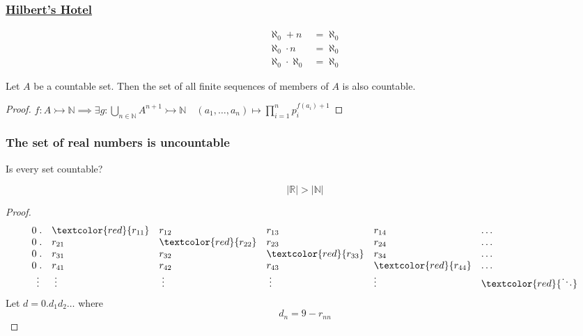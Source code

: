 \documentclass[UTF8,aspectratio=43,11pt,colorlinks,compress,openany]{beamer}%
\begin{document}
\begin{frame}\frametitle{\href{https://www.quora.com/What-if-I-requested-the-last-room-at-the-Hilberts-Hotel/answer/Alon-Amit?__snid3__=463182494&__nsrc__=2&__filter__=&from=timeline}{Hilbert's Hotel}}
	\begin{align*}
	\aleph_0+n&=\aleph_0\\
	\aleph_0\cdot n&=\aleph_0\\
	\aleph_0\cdot\aleph_0&=\aleph_0
	\end{align*}
	\begin{theorem}
		Let $A$ be a countable set. Then the set of all finite sequences of members of $A$ is also countable.
	\end{theorem}
	\begin{proof}
		$f: A\rightarrowtail\mathbb{N}\implies\exists g:\bigcup\limits_{n\in\mathbb{N}} A^{n+1}\rightarrowtail\mathbb{N}\quad(a_1,\dots,a_n)\mapsto\prod\limits_{i=1}^n p_i^{f(a_i)+1}$
	\end{proof}
\end{frame}

\begin{frame}\frametitle{The set of real numbers is uncountable}
	\begin{center}
		Is every set countable?
	\end{center}
	\begin{theorem}[Cantor]
		\[|\mathbb{R}|>|\mathbb{N}|\]
	\end{theorem}
\setlength\abovedisplayskip{0pt}
\setlength\belowdisplayskip{0pt}
	\begin{proof}
		\[
		\begin{array}{rlllll}
		0\;.&\textcolor{red}{r_{11}}&r_{12}&r_{13}&r_{14}&\dots\\
		0\;.&r_{21}&\textcolor{red}{r_{22}}&r_{23}&r_{24}&\dots\\
		0\;.&r_{31}&r_{32}&\textcolor{red}{r_{33}}&r_{34}&\dots\\
		0\;.&r_{41}&r_{42}&r_{43}&\textcolor{red}{r_{44}}&\dots\\
		\vdots\; & \;\vdots&\;\vdots&\;\vdots\;&\vdots&\textcolor{red}{\ddots}
		\end{array}
		\]
		Let $d=0.d_1 d_2\dots$ where
		\[d_n=9-r_{nn}\]
	\end{proof}
\end{frame}
\end{document}
